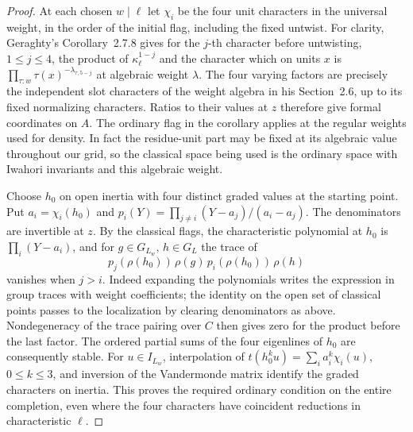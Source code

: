 \documentclass[a4paper,11pt]{article}
\theoremstyle{definition}
\theoremstyle{remark}
\numberwithin{equation}{section}
\begin{document}
\begin{proof}
At each chosen \(w\mid\ell\) let \(\chi_i\) be the four
unit characters in the universal weight, in the order of
the initial flag, including the fixed untwist. For clarity,
Geraghty's Corollary~2.7.8 gives for the \(j\)-th
character before untwisting, \(1\le j\le4\), the product
of \(\kappa_\ell^{1-j}\) and the character which on units
\(x\) is \(\prod_{\tau:w}\tau(x)^{-\lambda_{\tau,5-j}}\)
at algebraic weight \(\lambda\). The four varying factors
are precisely the independent slot characters of the
weight algebra in his Section~2.6, up to its fixed
normalizing characters. Ratios to their values at \(z\)
therefore give formal coordinates on \(A\). The ordinary
flag in the corollary applies at the regular weights used
for density. In fact the residue-unit part may be fixed at
its algebraic value throughout our grid, so the classical
space being used is the ordinary space with Iwahori
invariants and this algebraic weight. \cite{XII-IX-geraghty363}

Choose \(h_0\) on open inertia with four distinct graded
values at the starting point. Put \(a_i=\chi_i(h_0)\) and
\(p_i(Y)=\prod_{j\ne i}(Y-a_j)/(a_i-a_j)\). The denominators
are invertible at \(z\). By the classical flags, the
characteristic polynomial at \(h_0\) is \(\prod_i(Y-a_i)\),
and for \(g\in G_{L_w},\,h\in G_L\) the trace of
\[
           p_j(\rho(h_0))\,\rho(g)\,p_i(\rho(h_0))\,\rho(h)
\]
vanishes when \(j>i\). Indeed expanding the polynomials
writes the expression in group traces with weight
coefficients; the identity on the open set of classical
points passes to the localization by clearing denominators
as above. Nondegeneracy of the trace pairing over \(C\)
then gives zero for the product before the last factor.
The ordered partial sums of the four eigenlines of \(h_0\)
are consequently stable. For \(u\in I_{L_w}\), interpolation
of \(t(h_0^k u)=\sum_i a_i^k\chi_i(u)\), \(0\le k\le3\),
and inversion of the Vandermonde matrix identify the
graded characters on inertia. This proves the required
ordinary condition on the entire completion, even where
the four characters have coincident reductions in
characteristic \(\ell\).


\end{proof}
\end{document}
